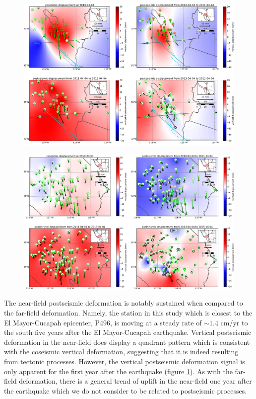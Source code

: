 \documentclass[1p]{elsarticle}
\begin{document}
\begin{figure}
\includegraphics[scale=0.7]{Figures/MapViewNearField}
\centering 
\caption{}
\label{fig:NearField}
\end{figure}

\begin{figure}
\includegraphics[scale=0.7]{Figures/MapViewFarField}
\centering 
\caption{}
\label{fig:FarField}
\end{figure}

The near-field postseismic deformation is notably sustained when compared to the far-field deformation.  Namely, the station in this study which is closest to the El Mayor-Cucapah epicenter, P496, is moving at a steady rate of $\sim1.4$ cm/yr to the south five years after the El Mayor-Cucapah earthquake.  Vertical postseismic deformation in the near-field does display a quadrant pattern which is consistent with the coseismic vertical deformation, suggesting that it is indeed resulting from tectonic processes.  However, the vertical postseismic deformation signal is only apparent for the first year after the earthquake (figure \ref{fig:NearField}).  As with the far-field deformation, there is a general trend of uplift in the near-field one year after the earthquake which we do not consider to be related to postseismic processes.  
\end{document}
